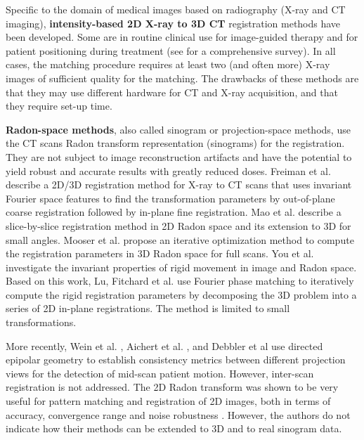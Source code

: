 Specific to the domain of medical images based on radiography (X-ray and CT imaging), \textbf{intensity-based 2D X-ray to 3D CT} registration methods have been developed. Some are in routine clinical use for image-guided therapy and for patient positioning during treatment (see \cite{markelj2012review} for a comprehensive survey). In all cases, the matching procedure requires at least two (and often more) X-ray images of sufficient quality for the matching. The drawbacks of these methods are that they may use different hardware for CT and X-ray acquisition, and that they require set-up time.

\textbf{Radon-space methods}, also called sinogram or projection-space methods, use the CT scans Radon transform representation (sinograms) for the registration. They are not subject to image reconstruction artifacts and have the potential to yield robust and accurate results with greatly reduced doses.
Freiman et al. \cite{freiman2011spectral} describe a 2D/3D registration method for X-ray to CT scans that uses invariant Fourier space features to find the transformation parameters by out-of-plane coarse registration followed by in-plane fine registration. 
Mao et al. \cite{mao2007ct} describe a slice-by-slice registration method in 2D Radon space and its extension to 3D for small angles.
Mooser et al. \cite{mooser2013estimation} propose an iterative optimization method to compute the registration parameters in 3D Radon space for full scans. 
You et al. \cite{you1998image} investigate the invariant properties of rigid movement in image and Radon space. 
Based on this work, Lu, Fitchard et al. \cite{lu1999image, fitchard1998registration, fitchard1999six} use Fourier phase matching to iteratively compute the rigid registration parameters by decomposing the 3D problem into a series of 2D in-plane registrations. The method is limited to small transformations. 

More recently, Wein et al. \cite{wein2011detecting}, Aichert et al. \cite{aichert2014redundancies,aichert2015epipolar}, and Debbler et al \cite{debbeler2013new} use directed epipolar geometry to establish consistency metrics between different projection views for the detection of mid-scan patient motion. However, inter-scan registration is not addressed. 
The 2D Radon transform was shown to be very useful for pattern matching and registration of 2D images, both in terms of accuracy, convergence range and noise robustness \cite{nacereddine2015similarity, wan2010fast}. However, the authors do not indicate how their methods can be extended to 3D and to real sinogram data. 

